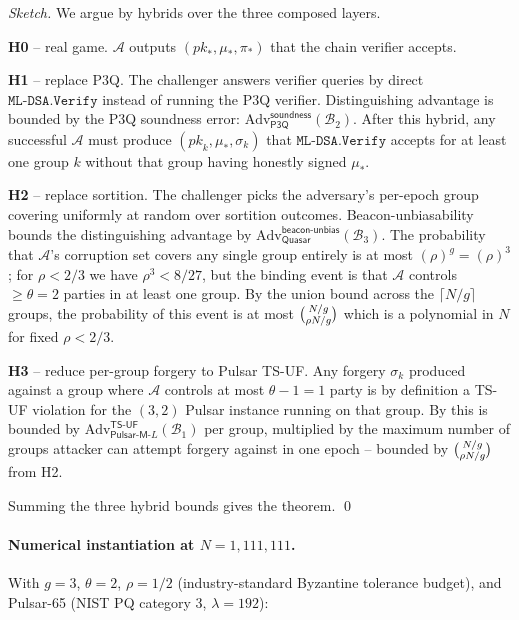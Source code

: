 \begin{proof}[Sketch]
We argue by hybrids over the three composed layers.

\textbf{H0} -- real game. $\mathcal{A}$ outputs
$(\mathit{pk}_*, \mu_*, \pi_*)$ that the chain verifier accepts.

\textbf{H1} -- replace P3Q. The challenger answers verifier queries
by direct $\mathtt{ML\text{-}DSA.Verify}$ instead of running the P3Q
verifier. Distinguishing advantage is bounded by the P3Q soundness
error:
$\mathrm{Adv}^{\mathsf{soundness}}_{\mathsf{P3Q}}(\mathcal{B}_2)$.
After this hybrid, any successful $\mathcal{A}$ must produce
$(\mathit{pk}_k, \mu_*, \sigma_k)$ that
$\mathtt{ML\text{-}DSA.Verify}$ accepts for at least one group $k$
without that group having honestly signed $\mu_*$.

\textbf{H2} -- replace sortition. The challenger picks the
adversary's per-epoch group covering uniformly at random over
sortition outcomes. Beacon-unbiasability bounds the distinguishing
advantage by
$\mathrm{Adv}^{\mathsf{beacon\text{-}unbias}}_{\mathsf{Quasar}}(\mathcal{B}_3)$.
The probability that $\mathcal{A}$'s corruption set covers any
single group entirely is at most $(\rho)^g = (\rho)^3$; for
$\rho < 2/3$ we have $\rho^3 < 8/27$, but the binding event is that
$\mathcal{A}$ controls $\ge \theta = 2$ parties in at least one
group. By the union bound across the $\lceil N/g \rceil$ groups, the
probability of this event is at most
$\tbinom{N/g}{\rho N / g}$ which is a polynomial in $N$ for fixed
$\rho < 2/3$.

\textbf{H3} -- reduce per-group forgery to Pulsar TS-UF. Any
forgery $\sigma_k$ produced against a group where $\mathcal{A}$
controls at most $\theta - 1 = 1$ party is by definition a
TS-UF violation for the $(3, 2)$ Pulsar instance running on that
group. By  this is bounded by
$\mathrm{Adv}^{\mathsf{TS\text{-}UF}}_{\mathsf{Pulsar\text{-}M}\text{-}L}(\mathcal{B}_1)$
per group, multiplied by the maximum number of groups attacker can
attempt forgery against in one epoch -- bounded by $\tbinom{N/g}{\rho
N/g}$ from H2.

Summing the three hybrid bounds gives the theorem. \qed
\end{proof}

\paragraph{Numerical instantiation at $N = 1{,}111{,}111$.}
With $g = 3$, $\theta = 2$, $\rho = 1/2$ (industry-standard
Byzantine tolerance budget), and Pulsar-65 (NIST PQ category 3,
$\lambda = 192$):

